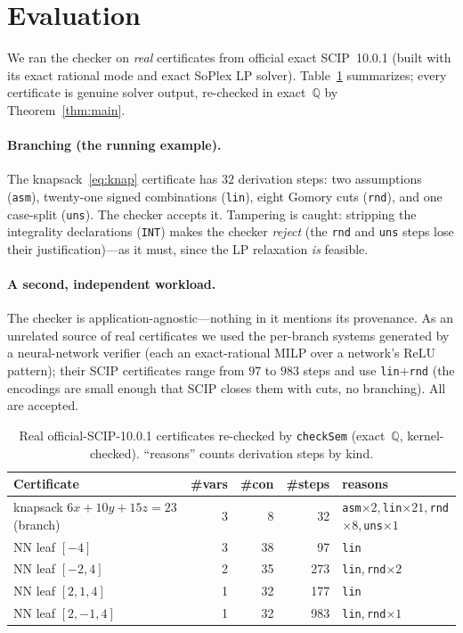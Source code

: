 \documentclass[runningheads]{llncs}
\newcommand{\code}[1]{\texttt{#1}}
\newcommand{\Q}{\mathbb{Q}}
\newcommand{\scip}{\textsc{SCIP}}
\begin{document}
\section{Evaluation}\label{sec:eval}

We ran the checker on \emph{real} certificates from official exact \scip{}~10.0.1 (built
with its exact rational mode and exact SoPlex LP solver). Table~\ref{tab:eval}
summarizes; every certificate is genuine solver output, re-checked in exact~$\Q$ by
Theorem~\ref{thm:main}.

\paragraph{Branching (the running example).} The knapsack~\eqref{eq:knap} certificate has
$32$ derivation steps: two assumptions (\code{asm}), twenty-one signed combinations
(\code{lin}), eight Gomory cuts (\code{rnd}), and one case-split (\code{uns}). The
checker accepts it. Tampering is caught: stripping the integrality declarations
(\code{INT}) makes the checker \emph{reject} (the \code{rnd} and \code{uns} steps lose
their justification)---as it must, since the LP relaxation \emph{is} feasible.

\paragraph{A second, independent workload.} The checker is
application-agnostic---nothing in it mentions its provenance. As an unrelated source of
real certificates we used the per-branch systems generated by a neural-network verifier
(each an exact-rational MILP over a network's ReLU pattern); their \scip{} certificates
range from $97$ to $983$ steps and use \code{lin}+\code{rnd} (the encodings are small
enough that \scip{} closes them with cuts, no branching). All are accepted.

\begin{table}[t]
\centering
\caption{Real official-\scip{}-10.0.1 certificates re-checked by \code{checkSem}
(exact~$\Q$, kernel-checked). ``reasons'' counts derivation steps by kind.}
\label{tab:eval}
\begin{tabular}{lrrrl}
\toprule
Certificate & \#vars & \#con & \#steps & reasons \\
\midrule
knapsack $6x{+}10y{+}15z{=}23$ (branch) & 3 & 8 & 32 &
  \code{asm}$\times2$,\,\code{lin}$\times21$,\,\code{rnd}$\times8$,\,\code{uns}$\times1$ \\
NN leaf $[-4]$          & 3 & 38 & 97  & \code{lin} \\
NN leaf $[-2,4]$        & 2 & 35 & 273 & \code{lin},\,\code{rnd}$\times2$ \\
NN leaf $[2,1,4]$       & 1 & 32 & 177 & \code{lin} \\
NN leaf $[2,-1,4]$      & 1 & 32 & 983 & \code{lin},\,\code{rnd}$\times1$ \\
\bottomrule
\end{tabular}
\end{table}
\end{document}
